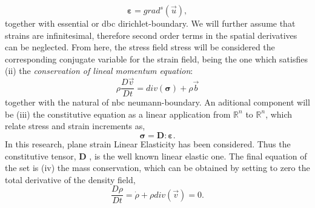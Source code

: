 \documentclass[preprint,12pt,a4paper]{elsarticle}
\newcommand{\tens}[1]{
  \ensuremath{\mathbf{{#1}}}
}
\newcommand{\Div}[1]{
  \ensuremath{div({#1})}
}
\newcommand\GradS[1]{grad^s({#1})}
\begin{document}
\begin{equation}
  \label{eq:Compatibility-equation}
  \tens{\varepsilon} = \GradS{\vec{u}},
\end{equation}
together with essential or \acrfull{dbc} \gls{dirichlet-boundary}. We will further assume that 
strains are 
infinitesimal, therefore second order terms
in the spatial derivatives can be neglected. From here, the
stress field \gls{stress} will be considered the corresponding
conjugate variable for the strain field, being the one which
satisfies (ii) the \textit{conservation of lineal momentum equation}:
\begin{equation}
  \label{eq:Balance-momentum}
\rho \frac{D\vec{v}}{Dt} = \Div{\tens{\sigma}} + \rho \vec{b}
\end{equation}
together with the natural of \acrfull{nbc} \gls{neumann-boundary}.  An aditional component will be (iii) the constitutive equation as a linear
application from $\mathbb{R}^n$ to $\mathbb{R}^n$, which relate stress and strain increments as,
\begin{equation}
  \label{eq:Constitutive-equation}
\tens{\sigma} = \tens{D} \colon \tens{\varepsilon}.
\end{equation}
In this research, plane strain Linear Elasticity has been
  considered. Thus the constitutive tensor, \tens{D}, is the well
  known linear elastic one. The final equation of the set is (iv) the mass
conservation, which can be obtained by setting to zero the total derivative of the density field,
\begin{equation}
  \label{eq:Rho-material-derivative}
  \frac{D \rho}{D t} = \dot{\rho} + \rho \Div{\vec{v}} = 0.
\end{equation}
\end{document}
